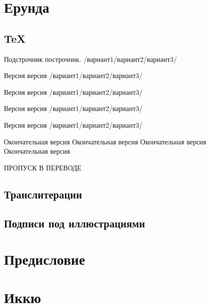 \documentclass[utf8,unicode=true]{article}
\begin{document}
\pagestyle{fancy}
\setcounter{section}{-1}
\section{Ерунда}
\subsection{TeX}
\begin{ver}
 Подстрочник 
построчник. /вариант1/вариант2/вариант3/
\end{ver}

\begin{ver}[1]
  Версия  версия /вариант1/вариант2/вариант3/
\end{ver}

\begin{ver}[2]
  Версия  версия /вариант1/вариант2/вариант3/
\end{ver}

\begin{ver}[3]
  Версия  версия /вариант1/вариант2/вариант3/
\end{ver}

\begin{ver}[4]
  Версия  версия /вариант1/вариант2/вариант3/
\end{ver}

\begin{ver}[5]
  Окончательная версия   Окончательная версия   Окончательная версия
  Окончательная версия    
\end{ver}



ПРОПУСК В ПЕРЕВОДЕ
\pt

\subsection{Транслитерации}

\subsection{Подписи под иллюстрациями}
\newpage

\section{Предисловие}

\newpage
\section{Иккю}
\newpage
\pt
\end{document}
